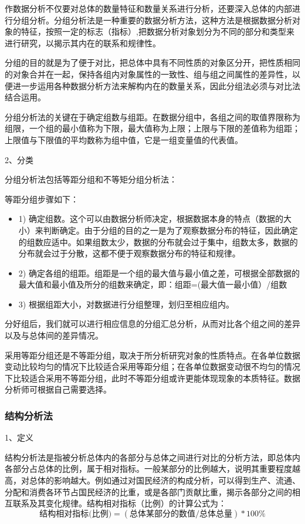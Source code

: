 作数据分析不仅要对总体的数量特征和数量关系进行分析，还要深入总体的内部进行分组分析。分组分析法是一种重要的数据分析方法，这种方法是根据数据分析对象的特征，按照一定的标志（指标）,把数据分析对象划分为不同的部分和类型来进行研究，以揭示其内在的联系和规律性。

分组的目的就是为了便于对比，把总体中具有不同性质的对象区分开，把性质相同的对象合并在一起，保持各组内对象属性的一致性、组与组之间属性的差异性，以便进一步运用各种数据分析方法来解构内在的数量关系，因此分组法必须与对比法结合运用。

分组分析法的关键在于确定组数与组距。在数据分组中，各组之间的取值界限称为组限，一个组的最小值称为下限，最大值称为上限；上限与下限的差值称为组距；上限值与下限值的平均数称为组中值，它是一组变量值的代表值。


2、分类

分组分析法包括等距分组和不等矩分组分析法：

等距分组步骤如下：
\begin{itemize}
    \item 1) 确定组数。这个可以由数据分析师决定，根据数据本身的特点（数据的大小）来判断确定。由于分组的目的之一是为了观察数据分布的特征，因此确定的组数应适中。如果组数太少，数据的分布就会过于集中，组数太多，数据的分布就会过于分散，这都不便于观察数据分布的特征和规律。
    \item 2) 确定各组的组距。组距是一个组的最大值与最小值之差，可根据全部数据的最大值和最小值及所分的组数来确定，即：组距=(最大值一最小值）/组数
    \item 3) 根据组距大小，对数据进行分组整理，划归至相应组内。
\end{itemize}

分好组后，我们就可以进行相应信息的分组汇总分析，从而对比各个组之间的差异以及与总体间的差异情况。

采用等距分组还是不等距分组，取决于所分析研究对象的性质特点。在各单位数据变动比较均匀的情况下比较适合采用等距分组；在各单位数据变动很不均匀的情况下比较适合采用不等距分组，此时不等距分组或许更能体现现象的本质特征。数据分析师可根据自己需要选择。

\subsubsection{结构分析法}

1、定义

结构分析法是指被分析总体内的各部分与总体之间进行对比的分析方法，即总体内各部分占总体的比例，属于相对指标。一般某部分的比例越大，说明其重要程度越高，对总体的影响越大。例如通过对国民经济的构成分析，可以得到生产、流通、分配和消费各环节占国民经济的比重，或是各部门贡献比重，揭示各部分之间的相互联系及其变化规律。结构相对指标（比例）的计算公式为：
\begin{equation}
\mbox{结构相对指标(比例)}=(\mbox{总体某部分的数值}/\mbox{总体总量}) * 100 \%
\end{equation}

